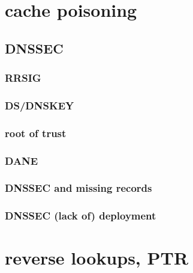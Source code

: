 \section{cache poisoning}




\subsection{DNSSEC}


\subsubsection{RRSIG}


\subsubsection{DS/DNSKEY}


\subsubsection{root of trust}


\subsubsection{DANE}


\subsubsection{DNSSEC and missing records}


\subsubsection{DNSSEC (lack of) deployment}


\section{reverse lookups, PTR}




